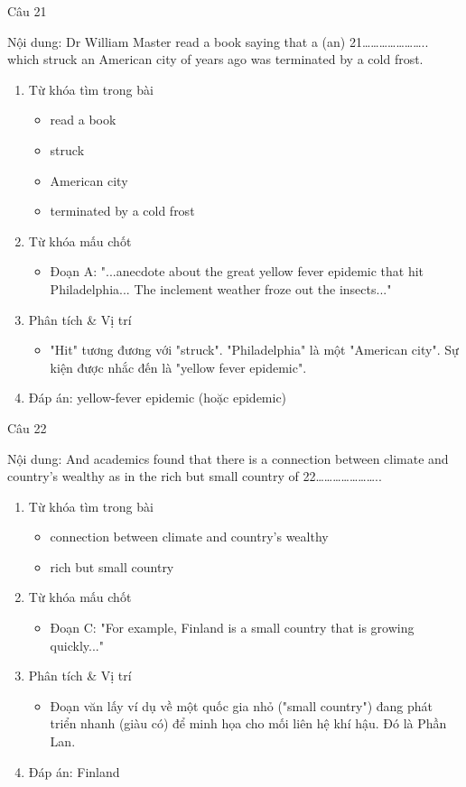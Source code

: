 \documentclass{../templateReading/cdreading}
\begin{document}


Câu 21

Nội dung: Dr William Master read a book saying that a (an) 21………………….. which struck an American city of years ago was terminated by a cold frost.
\begin{enumerate}
\item Từ khóa tìm trong bài
\begin{itemize}
\item read a book
\item struck
\item American city
\item terminated by a cold frost
\end{itemize}
\item Từ khóa mấu chốt
\begin{itemize}
\item Đoạn A: "...anecdote about the great yellow fever epidemic that hit Philadelphia... The inclement weather froze out the insects..."
\end{itemize}
\item Phân tích \& Vị trí
\begin{itemize}
\item "Hit" tương đương với "struck". "Philadelphia" là một "American city". Sự kiện được nhắc đến là "yellow fever epidemic".
\end{itemize}
\item Đáp án: yellow-fever epidemic (hoặc epidemic)
\end{enumerate}

Câu 22

Nội dung: And academics found that there is a connection between climate and country’s wealthy as in the rich but small country of 22…………………..
\begin{enumerate}
\item Từ khóa tìm trong bài
\begin{itemize}
\item connection between climate and country’s wealthy
\item rich but small country
\end{itemize}
\item Từ khóa mấu chốt
\begin{itemize}
\item Đoạn C: "For example, Finland is a small country that is growing quickly..."
\end{itemize}
\item Phân tích \& Vị trí
\begin{itemize}
\item Đoạn văn lấy ví dụ về một quốc gia nhỏ ("small country") đang phát triển nhanh (giàu có) để minh họa cho mối liên hệ khí hậu. Đó là Phần Lan.
\end{itemize}
\item Đáp án: Finland
\end{enumerate}
\end{document}
